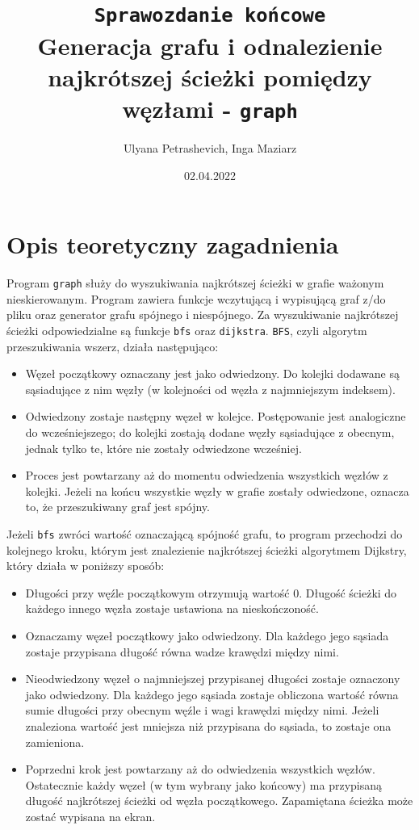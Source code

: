 \documentclass[]{article}
\title{\texttt{Sprawozdanie końcowe}\\Generacja grafu i odnalezienie najkrótszej ścieżki pomiędzy węzłami - \texttt{graph}}
\author{Ulyana Petrashevich, Inga Maziarz}
\date{02.04.2022}
\begin{document}
\maketitle

\section{Opis teoretyczny zagadnienia}\label{header-n231}
Program \texttt{graph} służy do wyszukiwania najkrótszej ścieżki w grafie ważonym nieskierowanym. Program zawiera funkcje wczytującą i wypisującą graf z/do pliku oraz generator grafu spójnego i niespójnego. Za wyszukiwanie najkrótszej ścieżki odpowiedzialne są funkcje \texttt{bfs} oraz \texttt{dijkstra}. \texttt{BFS}, czyli algorytm przeszukiwania wszerz, działa następująco: 
\begin{itemize}
\item
  Węzeł początkowy oznaczany jest jako odwiedzony. Do kolejki dodawane są sąsiadujące z nim węzły (w kolejności od węzła z najmniejszym indeksem).
\item
  Odwiedzony zostaje następny węzeł w kolejce. Postępowanie jest analogiczne do wcześniejszego; do kolejki zostają dodane węzły sąsiadujące z obecnym, jednak tylko te, które nie zostały odwiedzone wcześniej.
  
\item
  Proces jest powtarzany aż do momentu odwiedzenia wszystkich węzłów z kolejki. Jeżeli na końcu wszystkie węzły w grafie zostały odwiedzone, oznacza to, że przeszukiwany graf jest spójny. 
\end{itemize}
Jeżeli \texttt{bfs} zwróci wartość oznaczającą spójność grafu, to program przechodzi do kolejnego kroku, którym jest znalezienie najkrótszej ścieżki algorytmem Dijkstry, który działa w poniższy sposób:
\begin{itemize}
\item
Długości przy węźle początkowym otrzymują wartość 0. Długość ścieżki do każdego innego węzła zostaje ustawiona na nieskończoność. 
\item
  Oznaczamy węzeł początkowy jako odwiedzony. Dla każdego jego sąsiada zostaje przypisana długość równa wadze krawędzi między nimi. 
\item
  Nieodwiedzony węzeł o najmniejszej przypisanej długości zostaje oznaczony jako odwiedzony. Dla każdego jego sąsiada zostaje obliczona wartość równa sumie długości przy obecnym węźle i wagi krawędzi między nimi. Jeżeli znaleziona wartość jest mniejsza niż przypisana do sąsiada, to zostaje ona zamieniona. 
\item
  Poprzedni krok jest powtarzany aż do odwiedzenia wszystkich węzłów. Ostatecznie każdy węzeł (w tym wybrany jako końcowy) ma przypisaną długość najkrótszej ścieżki od węzła początkowego. Zapamiętana ścieżka może zostać wypisana na ekran.
\end{itemize}
\end{document}
